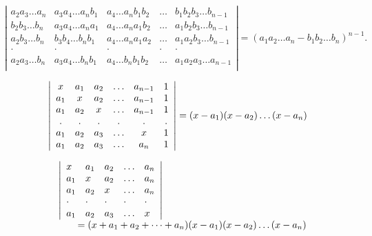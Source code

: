 \[
\left| \begin{array}{cccccc} a _ {2} a _ {3} \ldots a _ {n} & a _ {3} a _ {4} \ldots a _ {n} b _ {1} & a _ {4} \ldots a _ {n} b _ {1} b _ {2} & \ldots & b _ {1} b _ {2} b _ {3} \ldots b _ {n - 1} \\ b _ {2} b _ {3} \ldots b _ {n} & a _ {3} a _ {4} \ldots a _ {n} a _ {1} & a _ {4} \ldots a _ {n} a _ {1} b _ {2} & \ldots & a _ {1} b _ {2} b _ {3} \ldots b _ {n - 1} \\ a _ {2} b _ {3} \ldots b _ {n} & b _ {3} b _ {4} \ldots b _ {n} b _ {1} & a _ {4} \ldots a _ {n} a _ {1} a _ {2} & \ldots & a _ {1} a _ {2} b _ {3} \ldots b _ {n - 1} \\ \cdot & \cdot & \cdot & \cdot & \cdot \\ a _ {2} a _ {3} \ldots b _ {n} & a _ {3} a _ {4} \ldots b _ {n} b _ {1} & a _ {4} \ldots b _ {n} b _ {1} b _ {2} & \ldots & a _ {1} a _ {2} a _ {3} \ldots a _ {n - 1} \\ \end{array} \right| = (a _ {1} a _ {2} \ldots a _ {n} - b _ {1} b _ {2} \ldots b _ {n}) ^ {n - 1}.
\]

\[
\left| \begin{array}{c c c c c c} x & a _ {1} & a _ {2} & \ldots & a _ {n - 1} & 1 \\ a _ {1} & x & a _ {2} & \ldots & a _ {n - 1} & 1 \\ a _ {1} & a _ {2} & x & \ldots & a _ {n - 1} & 1 \\ . & . & . & . & . & . \\ a _ {1} & a _ {2} & a _ {3} & \ldots & x & 1 \\ a _ {1} & a _ {2} & a _ {3} & \ldots & a _ {n} & 1 \end{array} \right| = (x - a _ {1}) (x - a _ {2}) \ldots (x - a _ {n})
\]

\[
\begin{array}{r l} & {\left| \begin{array}{l l l l l} x & a _ {1} & a _ {2} & \ldots & a _ {n} \\ a _ {1} & x & a _ {2} & \ldots & a _ {n} \\ a _ {1} & a _ {2} & x & \ldots & a _ {n} \\ \cdot & \cdot & \cdot & \cdot & \cdot \\ a _ {1} & a _ {2} & a _ {3} & \ldots & x \end{array} \right|} \\ & {\qquad = (x + a _ {1} + a _ {2} + \dots + a _ {n}) (x - a _ {1}) (x - a _ {2}) \ldots (x - a _ {n})} \end{array}
\]

